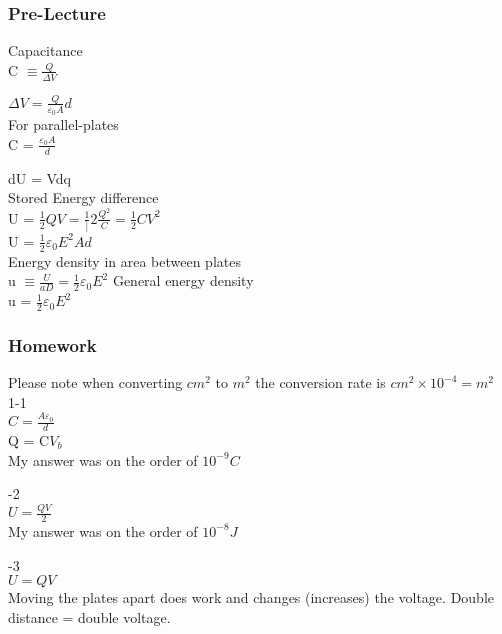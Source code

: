 \documentclass{article}
\begin{document}
\subsubsection{Pre-Lecture}

\noindent 
Capacitance \\
C $\equiv \frac{Q}{\Delta V}$

\vspace{2mm}

\noindent 
$\Delta V = \frac{Q}{\varepsilon_0 A} d$ \\
For parallel-plates \\
C = $\frac{\varepsilon_0 A}{d}$

\vspace{2mm}

\noindent
dU = Vdq \\
Stored Energy difference \\
U = $\frac{1}{2}QV = \frac{1}]{2} \frac{Q^2}{C} = \frac{1}{2} CV^2 $ \\
U = $\frac{1}{2} \varepsilon_0 E^2 Ad$ \\
Energy density in area between plates \\
u $\equiv \frac{U}{aD} = \frac{1}{2}\varepsilon_0 E^2$
General energy density \\
u = $\frac{1}{2}\varepsilon_0 E^2$

\vspace{2mm}


\subsubsection{Homework}
\noindent
Please note when converting $cm^2$ to $m^2$ the conversion rate is $cm^2\times 10^{-4}=m^2$ \\
1-1 \\
$C= \frac{A\varepsilon_0}{d}$ \\
Q = C$V_b$ \\
My answer was on the order of $10^{-9} C$
\vspace{2mm}

-2 \\
$U=\frac{QV}{2}$ \\
My answer was on the order of  $10^{-8}J$
\vspace{2mm}

-3 \\
$U=QV$ \\
Moving the plates apart does work and changes (increases) the voltage. Double distance = double voltage.
\end{document}
